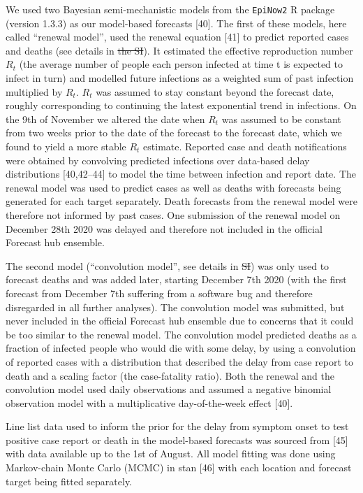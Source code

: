 \documentclass[10pt,letterpaper]{article}
\providecommand{\DIFdeltex}[1]{{\protect\color{red}\sout{#1}}}                      %
\providecommand{\DIFaddbegin}{} %
\providecommand{\DIFaddend}{} %
\providecommand{\DIFdelbegin}{} %
\providecommand{\DIFdelend}{} %
\providecommand{\DIFdel}[1]{\texorpdfstring{\DIFdeltex{#1}}{}} %
\newcommand{\DIFscaledelfig}{0.5}
\newlength{\DIFdelgraphicswidth} %
\newlength{\DIFdelgraphicsheight} %
\newcommand{\DIFaddincludegraphics}[2][]{{\color{blue}\fbox{\DIFOincludegraphics[#1]{#2}}}} %
\newcommand{\DIFdelincludegraphics}[2][]{%
\sbox{\DIFdelgraphicsbox}{\DIFOincludegraphics[#1]{#2}}%
\settoboxwidth{\DIFdelgraphicswidth}{\DIFdelgraphicsbox} %
\settoboxtotalheight{\DIFdelgraphicsheight}{\DIFdelgraphicsbox} %
\scalebox{\DIFscaledelfig}{%
\parbox[b]{\DIFdelgraphicswidth}{\usebox{\DIFdelgraphicsbox}\\[-\baselineskip] \rule{\DIFdelgraphicswidth}{0em}}\llap{\resizebox{\DIFdelgraphicswidth}{\DIFdelgraphicsheight}{%
\setlength{\unitlength}{\DIFdelgraphicswidth}%
\begin{picture}(1,1)%
\thicklines\linethickness{2pt} %
{\color[rgb]{1,0,0}\put(0,0){\framebox(1,1){}}}%
{\color[rgb]{1,0,0}\put(0,0){\line( 1,1){1}}}%
{\color[rgb]{1,0,0}\put(0,1){\line(1,-1){1}}}%
\end{picture}%
}\hspace*{3pt}}} %
} %
\DeclareRobustCommand{\DIFaddbegin}{\DIFOaddbegin \let\includegraphics\DIFaddincludegraphics} %
\DeclareRobustCommand{\DIFaddend}{\DIFOaddend \let\includegraphics\DIFOincludegraphics} %
\DeclareRobustCommand{\DIFdelbegin}{\DIFOdelbegin \let\includegraphics\DIFdelincludegraphics} %
\DeclareRobustCommand{\DIFdelend}{\DIFOaddend \let\includegraphics\DIFOincludegraphics} %
\begin{document}
We used two Bayesian semi-mechanistic models from the \texttt{EpiNow2} R
package (version 1.3.3) as our model-based forecasts {[}40{]}. The first
of these models, here called ``renewal model'', used the renewal
equation {[}41{]} to predict reported cases and deaths (see details in
\DIFdelbegin \DIFdel{the SI}\DIFdelend \DIFaddbegin {}\DIFaddend ). It estimated the effective reproduction
number \(R_t\) (the average number of people each person infected at
time t is expected to infect in turn) and modelled future infections as
a weighted sum of past infection multiplied by \(R_t\). \(R_t\) was
assumed to stay constant beyond the forecast date, roughly corresponding
to continuing the latest exponential trend in infections. On the 9th of
November we altered the date when \(R_t\) was assumed to be constant
from two weeks prior to the date of the forecast to the forecast date,
which we found to yield a more stable \(R_t\) estimate. Reported case
and death notifications were obtained by convolving predicted infections
over data-based delay distributions {[}40,42--44{]} to model the time
between infection and report date. The renewal model was used to predict
cases as well as deaths with forecasts being generated for each target
separately. Death forecasts from the renewal model were therefore not
informed by past cases. One submission of the renewal model on December
28th 2020 was delayed and therefore not included in the official
Forecast hub ensemble.

The second model (``convolution model'', see details in
\DIFdelbegin \DIFdel{SI}\DIFdelend \DIFaddbegin {}\DIFaddend ) was only used to forecast deaths and was
added later, starting December 7th 2020 (with the first forecast from
December 7th suffering from a software bug and therefore disregarded in
all further analyses). The convolution model was submitted, but never
included in the official Forecast hub ensemble due to concerns that it
could be too similar to the renewal model. The convolution model
predicted deaths as a fraction of infected people who would die with
some delay, by using a convolution of reported cases with a distribution
that described the delay from case report to death and a scaling factor
(the case-fatality ratio). Both the renewal and the convolution model
used daily observations and assumed a negative binomial observation
model with a multiplicative day-of-the-week effect {[}40{]}.

Line list data used to inform the prior for the delay from symptom onset
to test positive case report or death in the model-based forecasts was
sourced from {[}45{]} with data available up to the 1st of August. All
model fitting was done using Markov-chain Monte Carlo (MCMC) in stan
{[}46{]} with each location and forecast target being fitted separately.
\end{document}
